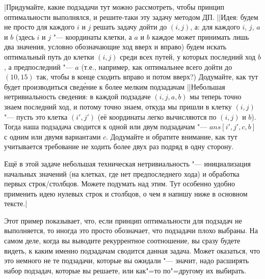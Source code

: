 \task|Придумайте, какие подзадачи тут можно рассмотреть, чтобы принцип оптимальности выполнялся, и решите-таки эту 
задачу методом ДП.
||Идея: будем не просто для каждого $i$ и $j$ решать задачу дойти до $(i,j)$, а: для каждого $i$, $j$, $a$ и $b$ (здесь $i$ и $j$ "--- координаты клетки, а $a$ и $b$ каждое может принимать лишь два значения, условно обозначающие ход вверх и вправо) будем искать оптимальный путь до клетки $(i,j)$ среди всех путей, у которых последний ход $b$, а предпоследний "--- $a$ (т.е., например, как оптимальнее всего дойти до $(10,15)$ так, чтобы в конце сходить вправо и потом вверх?) Додумайте, как тут будет производиться свед\'{е}ние к более мелким подзадачам
||Небольшая нетривиальность сведения: в каждой подзадаче $(i,j,a,b)$ мы теперь точно знаем последний ход, и потому точно знаем, откуда мы пришли в клетку $(i,j)$ "--- пусть это клетка $(i',j')$ (её координаты легко вычисляются по $(i,j)$ и $b$). Тогда наша подзадача сводится к одной или двум подзадачам "--- $ans[i',j',c,b]$ с одним или двумя вариантами $c$. Додумайте и обратите внимание, как тут учитывается требование не ходить более двух раз подряд в одну сторону.

Ещё в этой задаче небольшая техническая нетривиальность "--- инициализация начальных значений (на клетках, где нет предпоследнего хода) и обработка первых строк/столбцов. Можете подумать над этим. Тут особенно удобно применить идею нулевых строк и столбцов, о чем я напишу ниже в основном тексте.|

Этот пример показывает, что, если принцип оптимальности для подзадач не выполняется, то иногда это просто обозначает,
что подзадачи плохо выбраны. На самом деле, когда вы выводите рекуррентное соотношение, вы сразу будете видеть,
к каким именно подзадачам сводится данная задача. Может оказаться, что это немного не те подзадачи,
которые вы ожидали "--- значит, надо расширять набор подзадач, которые вы решаете, или как"=то по"=другому
их выбирать.

